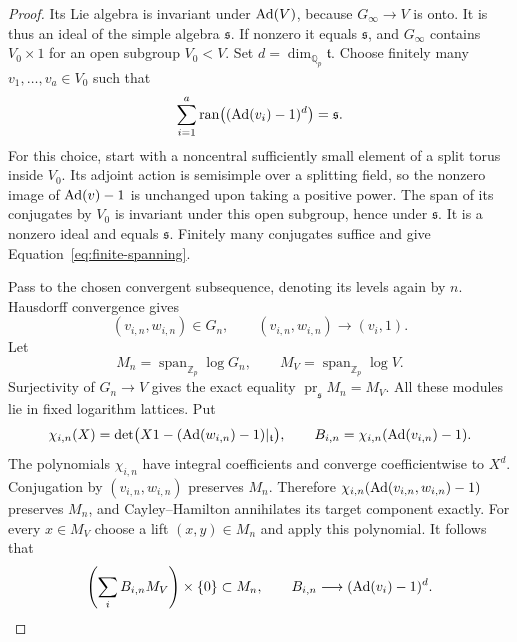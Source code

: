 \begin{proof}
Its Lie algebra is invariant under $\operatorname{Ad}(V)$, because
$G_\infty\to V$ is onto.  It is thus an ideal of the simple algebra
$\mathfrak s$.  If nonzero it equals $\mathfrak s$, and
$G_\infty$ contains $V_0\times1$ for an open subgroup $V_0<V$.
Set $d=\dim_{\mathbb Q_p}\mathfrak t$.
Choose finitely many $v_1,\ldots,v_a\in V_0$ such that
\begin{equation}
 \sum_{i=1}^a
   \operatorname{ran}\bigl((\operatorname{Ad}(v_i)-1)^d\bigr)=\mathfrak s.
 \label{eq:finite-spanning}
\end{equation}
For this choice, start with a noncentral sufficiently small element
of a split torus inside $V_0$.  Its adjoint action is semisimple
over a splitting field, so the nonzero image of $\operatorname{Ad}(v)-1$ is
unchanged upon taking a positive power.  The span of its conjugates
by $V_0$ is invariant under this open subgroup, hence under
$\mathfrak s$.  It is a nonzero ideal and equals $\mathfrak s$.
Finitely many conjugates suffice and give
Equation~\eqref{eq:finite-spanning}.

Pass to the chosen convergent subsequence, denoting its levels again
by $n$.  Hausdorff convergence gives
\[
 (v_{i,n},w_{i,n})\in G_n,\qquad
 (v_{i,n},w_{i,n})\longrightarrow(v_i,1).
\]
Let
\[
 M_n=\operatorname{span}_{\mathbb Z_p}\log G_n,\qquad
 M_V=\operatorname{span}_{\mathbb Z_p}\log V.
\]
Surjectivity of $G_n\to V$ gives the exact equality
$\operatorname{pr}_{\mathfrak s}M_n=M_V$.
All these modules lie in fixed logarithm lattices.
Put
\[
 \chi_{i,n}(X)=\det\bigl(X1-(\operatorname{Ad}(w_{i,n})-1)|_{\mathfrak t}\bigr),
 \qquad
 B_{i,n}=\chi_{i,n}(\operatorname{Ad}(v_{i,n})-1).
\]
The polynomials $\chi_{i,n}$ have integral coefficients and converge
coefficientwise to $X^d$.  Conjugation by $(v_{i,n},w_{i,n})$
preserves $M_n$.  Therefore
$\chi_{i,n}(\operatorname{Ad}(v_{i,n},w_{i,n})-1)$ preserves $M_n$, and
Cayley--Hamilton annihilates its target component exactly.
For every $x\in M_V$ choose a lift $(x,y)\in M_n$ and apply this
polynomial.  It follows that
\begin{equation}
 \left(\sum_i B_{i,n}M_V\right)\times\{0\}\subset M_n,\qquad
 B_{i,n}\longrightarrow(\operatorname{Ad}(v_i)-1)^d.
 \label{eq:finite-polynomial-lattice}
\end{equation}


\end{proof}
